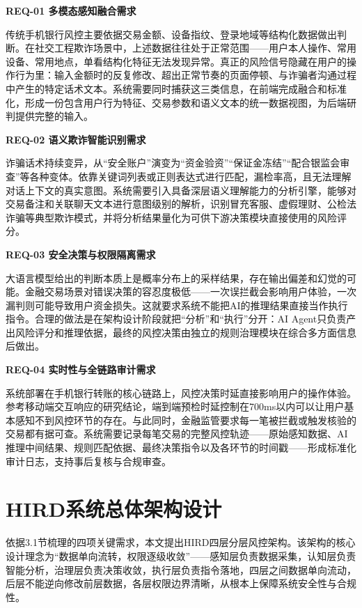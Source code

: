 \documentclass[twoside,openright]{xduugthesis}
\begin{document}
\textbf{REQ-01 多模态感知融合需求}

传统手机银行风控主要依据交易金额、设备指纹、登录地域等结构化数据做出判断。在社交工程欺诈场景中，上述数据往往处于正常范围——用户本人操作、常用设备、常用地点，单看结构化特征无法发现异常。真正的风险信号隐藏在用户的操作行为里：输入金额时的反复修改、超出正常节奏的页面停顿、与诈骗者沟通过程中产生的特定话术文本。系统需要同时捕获这三类信息，在前端完成融合和标准化，形成一份包含用户行为特征、交易参数和语义文本的统一数据视图，为后端研判提供完整的输入。

\textbf{REQ-02 语义欺诈智能识别需求}

诈骗话术持续变异，从“安全账户”演变为“资金验资”“保证金冻结”“配合银监会审查”等各种变体。依靠关键词列表或正则表达式进行匹配，漏检率高，且无法理解对话上下文的真实意图。系统需要引入具备深层语义理解能力的分析引擎，能够对交易备注和关联聊天文本进行意图级别的解析，识别冒充客服、虚假理财、公检法诈骗等典型欺诈模式，并将分析结果量化为可供下游决策模块直接使用的风险评分。

\textbf{REQ-03 安全决策与权限隔离需求}

大语言模型给出的判断本质上是概率分布上的采样结果，存在输出偏差和幻觉的可能。金融交易场景对错误决策的容忍度极低——一次误拦截会影响用户体验，一次漏判则可能导致用户资金损失。这就要求系统不能把AI的推理结果直接当作执行指令。合理的做法是在架构设计阶段就把“分析”和“执行”分开：AI Agent只负责产出风险评分和推理依据，最终的风控决策由独立的规则治理模块在综合多方面信息后做出。

\textbf{REQ-04 实时性与全链路审计需求}

系统部署在手机银行转账的核心链路上，风控决策时延直接影响用户的操作体验。参考移动端交互响应的研究结论，端到端预检时延控制在700ms以内可以让用户基本感知不到风控环节的存在。与此同时，金融监管要求每一笔被拦截或触发核验的交易都有据可查。系统需要记录每笔交易的完整风控轨迹——原始感知数据、AI推理中间结果、规则匹配依据、最终决策指令以及各环节的时间戳——形成标准化审计日志，支持事后复核与合规审查。

\section{HIRD系统总体架构设计}

依据3.1节梳理的四项关键需求，本文提出HIRD四层分层风控架构。该架构的核心设计理念为“数据单向流转，权限逐级收敛”——感知层负责数据采集，认知层负责智能分析，治理层负责决策收敛，执行层负责指令落地，四层之间数据单向流动，后层不能逆向修改前层数据，各层权限边界清晰，从根本上保障系统安全性与合规性。
\end{document}
